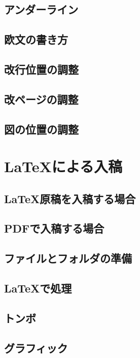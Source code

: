 \documentclass{jsbook}
\begin{document}
\section{アンダーライン}

\section{欧文の書き方}

\section{改行位置の調整}

\section{改ページの調整}

\section{図の位置の調整}

\chapter{\LaTeX による入稿}

\section{\LaTeX 原稿を入稿する場合}

\section{PDFで入稿する場合}

\section{ファイルとフォルダの準備}

\section{\LaTeX で処理}

\section{トンボ}

\section{グラフィック}
\end{document}
